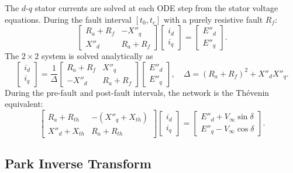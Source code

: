 \documentclass[12pt,a4paper]{article}
\theoremstyle{definition}
\theoremstyle{plain}
\begin{document}
The $d$-$q$ stator currents are solved at each ODE step from the stator
voltage equations.  During the fault interval $[t_0, t_c]$ with a
purely resistive fault $R_f$:
\begin{equation}
  \begin{bmatrix}
    R_a + R_f & -X''_q \\
    X''_d     &  R_a + R_f
  \end{bmatrix}
  \begin{bmatrix} i_d \\ i_q \end{bmatrix}
  =
  \begin{bmatrix} E''_d \\ E''_q \end{bmatrix}.
  \label{eq:parkdq:algebraic_fault}
\end{equation}
The $2\times 2$ system is solved analytically as
\begin{equation}
  \begin{bmatrix} i_d \\ i_q \end{bmatrix}
  = \frac{1}{\Delta}
  \begin{bmatrix}
    R_a + R_f & X''_q \\
   -X''_d    & R_a + R_f
  \end{bmatrix}
  \begin{bmatrix} E''_d \\ E''_q \end{bmatrix},
  \quad
  \Delta = (R_a + R_f)^2 + X''_d X''_q.
  \label{eq:parkdq:solve_idiq}
\end{equation}
During the pre-fault and post-fault intervals, the network is the
Th\'{e}venin equivalent:
\begin{equation}
  \begin{bmatrix}
    R_a + R_{th} & -(X''_q + X_{th}) \\
    X''_d + X_{th}&  R_a + R_{th}
  \end{bmatrix}
  \begin{bmatrix} i_d \\ i_q \end{bmatrix}
  =
  \begin{bmatrix}
    E''_d + V_\infty \sin\delta \\
    E''_q - V_\infty \cos\delta
  \end{bmatrix}.
  \label{eq:parkdq:algebraic_prefault}
\end{equation}

\subsection{Park Inverse Transform}
\label{sec:parkdq:park}
\end{document}
